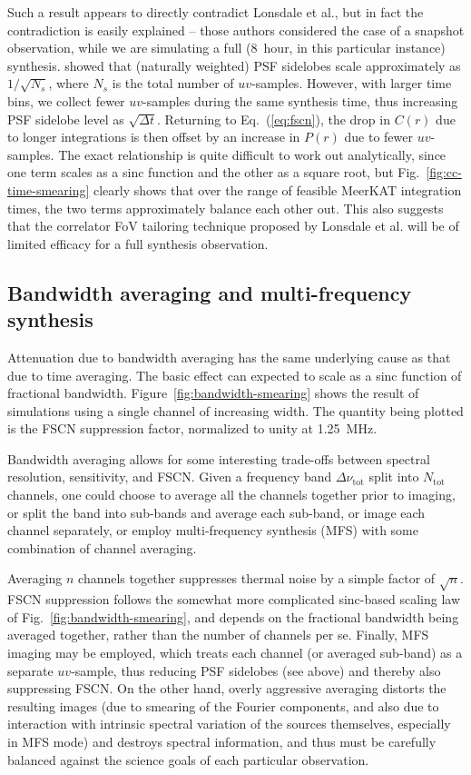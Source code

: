 \documentclass{aa}
\begin{document}
Such a result appears to directly contradict Lonsdale et al., but in fact the contradiction is easily explained -- those authors considered the case of a snapshot observation, while we are simulating a full (8~hour, in this particular instance) synthesis. \citet{SKA49} showed that (naturally weighted) PSF sidelobes scale approximately as $1/\sqrt{N_s}$, where $N_s$ is the total number of $uv$-samples. However, with larger time bins, we collect fewer $uv$-samples during the same synthesis time, thus increasing PSF sidelobe level as $\sqrt{\Delta t}$. Returning to Eq.~(\ref{eq:fscn}), the drop in $C(r)$ due to longer integrations is then offset by an increase in $P(r)$ due to fewer $uv$-samples. The exact relationship is quite difficult to work out analytically, since one term scales as a sinc function and the other as a square root, but  Fig.~\ref{fig:cc-time-smearing} clearly shows that over the range of feasible MeerKAT integration times, the two terms approximately balance each other out. This also suggests that the correlator FoV tailoring technique proposed by Lonsdale et al. will be of limited efficacy for a full synthesis observation.

\subsection{Bandwidth averaging and multi-frequency synthesis}
\label{sec:freq-avg}

Attenuation due to bandwidth averaging has the same underlying cause as that due to time averaging. The basic effect can expected to scale as a sinc function of fractional bandwidth. Figure~\ref{fig:bandwidth-smearing} shows the result of simulations using a single channel of increasing width. The quantity being plotted is the FSCN suppression factor, normalized to unity at 1.25~MHz.

Bandwidth averaging allows for some interesting trade-offs between spectral resolution, sensitivity, and FSCN. Given a frequency band $\Delta\nu_\mathrm{tot}$ split into $N_\mathrm{tot}$ channels, one could choose to average all the channels together prior to imaging, or split the band into sub-bands and average each sub-band, or image each channel separately, or employ multi-frequency synthesis (MFS) with some combination of channel averaging. 

Averaging $n$ channels together suppresses thermal noise by a simple factor of $\sqrt{n}$. FSCN suppression follows the somewhat more complicated sinc-based scaling law of Fig.~\ref{fig:bandwidth-smearing}, and depends on the fractional bandwidth being averaged together, rather than the number of channels per se. Finally, MFS imaging may be employed, which treats each channel (or averaged sub-band) as a separate $uv$-sample, thus reducing PSF sidelobes (see above) and thereby also suppressing FSCN. On the other hand, overly aggressive averaging distorts the resulting images (due to smearing of the Fourier components, and also due to interaction with intrinsic spectral variation of the sources themselves, especially in MFS mode) and destroys spectral information, and thus must be carefully balanced against the science goals of each particular observation.
\end{document}
